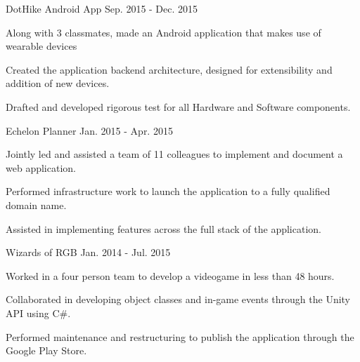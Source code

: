 \begin{cventries}
  \cventry
    {DotHike Android App} %
    {} %
    {} %
    {Sep. 2015 - Dec. 2015} %
    {
      \begin{cvitems} %
        \item {Along with 3 classmates, made an Android application that makes use of wearable devices}
        \item {Created the application backend architecture, designed for extensibility and addition of new devices.}
        \item {Drafted and developed rigorous test for all Hardware and Software components.}
        \\
      \end{cvitems}
    }
    
  \cventry
    {Echelon Planner} %
    {} %
    {} %
    {Jan. 2015 - Apr. 2015} %
    {
      \begin{cvitems} %
        \item {Jointly led and assisted a team of 11 colleagues to implement and document a web application.}
        \item {Performed infrastructure work to launch the application to a fully qualified domain name.}
        \item {Assisted in implementing features across the full stack of the application.}
        \\
      \end{cvitems}
    } 

  \cventry
    {Wizards of RGB} %
    {} %
    {} %
    {Jan. 2014 - Jul. 2015} %
    {
      \begin{cvitems} %
        \item {Worked in a four person team to develop a videogame in less than 48 hours.}
        \item {Collaborated in developing object classes and in-game events through the Unity API using C\#.}
        \item {Performed maintenance and restructuring to publish the application through the Google Play Store.}
        \\
      \end{cvitems}
    } 
    


\end{cventries}
